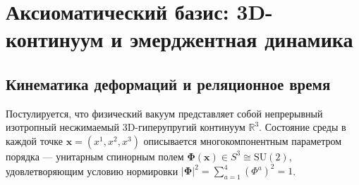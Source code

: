 \documentclass[12pt,a4paper]{article}
\begin{document}
\begin{abstract}
		Нейтринный сектор описан через 1D-редукцию репера Френе-Серре ($5 \to 3$ степени свободы девиатора), что фиксирует амплитуду $A_{1D} = \sqrt{1.2}$, нормальную иерархию масс ($\sum m_\nu \approx 59.1$ мэВ), реакторный угол $\sin^2(2\theta_{13}) = 1/12 \approx 0.0833$, атмосферный угол $\theta_{23} = \pi/4$, солнечный угол $\sin^2\theta_{12} = 1/3$ и фазу CP-нарушения $\delta_{CP} = \pi/2$ через антисимметричный гироскопический член Кориолиса. Предел прочности 1D-струны на 4-й моде ($N_4=28$) предсказывает кинематический порог перехода к глубоко неупругому рассеянию (DIS) при $E_{\nu, \text{crit}} \approx 67.1$ ГэВ.
		
		Интегрирование стоячей волны на узле $T(3,2)$ через механизм Джулии-Зи генерирует дробные заряды пучностей $(+2/3, +2/3, -1/3)$, доказывая кинематическую эмерджентность «кварков». Выведены зарядовый ($r_c = 4\lambda_p \approx 0.841$ фм) и массовый ($R_m = 3\lambda_p \approx 0.631$ фм) радиусы нуклона и фундаментальный дефект массы нейтрона $\Delta m = \frac{3}{16}\alpha M_p \approx 1.284$ МэВ ($T(3,2) \oplus S^2$). Вязкоупругая модель Кельвина-Фойхта объясняет времена жизни $\tau_\mu \approx 2.197 \ \mu\text{с}$, $\tau_\tau \approx 2.90 \times 10^{-13}$ с (фактор ветвления $B_e = 1/5$ из 5 девиаторных каналов) и разрешает аномалию времени жизни ультрахолодных нейтронов («пучок–ловушка») как макроскопический топологический эффект Парселла ($\Delta\tau = \frac{4}{3}\alpha\tau_{\text{beam}} = 8.64$ с). 
		
	\end{abstract}
	
	\tableofcontents
	\newpage
	
	\section{Аксиоматический базис: 3D-континуум и эмерджентная динамика}
	
	\subsection{Кинематика деформаций и реляционное время}
	Постулируется, что физический вакуум представляет собой непрерывный изотропный несжимаемый 3D-гиперупругий континуум $\mathbb{R}^3$. Состояние среды в каждой точке $\mathbf{x} = (x^1, x^2, x^3)$ описывается многокомпонентным параметром порядка — унитарным спинорным полем $\boldsymbol{\Phi}(\mathbf{x}) \in S^3 \cong \mathrm{SU}(2)$, удовлетворяющим условию нормировки $|\boldsymbol{\Phi}|^2 = \sum_{a=1}^4 (\Phi^a)^2 = 1$.
	
\end{document}
